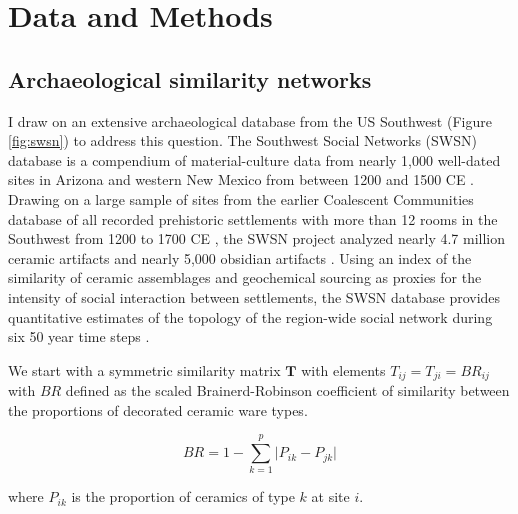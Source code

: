\documentclass[fleqn,10pt]{wlscirep}
\begin{document}





\section*{Data and Methods}

\subsection*{Archaeological similarity networks}

I draw on an extensive archaeological database from the US Southwest (Figure \ref{fig:swsn}) to address this question. The Southwest Social Networks (SWSN) database is a compendium of material-culture data from nearly 1,000 well-dated sites in Arizona and western New Mexico from between 1200 and 1500 CE \cite{Mills2012,Mills2013a,Peeples2013,Borck2015,Hill2015,Mills2015a}. Drawing on a large sample of sites from the earlier Coalescent Communities database of all recorded prehistoric settlements with more than 12 rooms in the Southwest from 1200 to 1700 CE \cite{Hill2004}, the SWSN project analyzed nearly 4.7 million ceramic artifacts and nearly 5,000 obsidian artifacts \cite{Mills2015a}. Using an index of the similarity of ceramic assemblages and geochemical sourcing as proxies for the intensity of social interaction between settlements, the SWSN database provides quantitative estimates of the topology of the region-wide social network during six 50 year time steps \cite{Mills2013a}.

We start with a symmetric similarity matrix $\mathbf{T}$ with elements $T_{ij} = T_{ji} = BR_{ij}$ with $BR$ defined as the scaled Brainerd-Robinson coefficient of similarity between the proportions of decorated ceramic ware types.

$$BR = 1 - \sum_{k=1}^{p} \lvert P_{ik} - P_{jk} \rvert$$

where $P_{ik}$ is the proportion of ceramics of type $k$ at site $i$.
\end{document}

